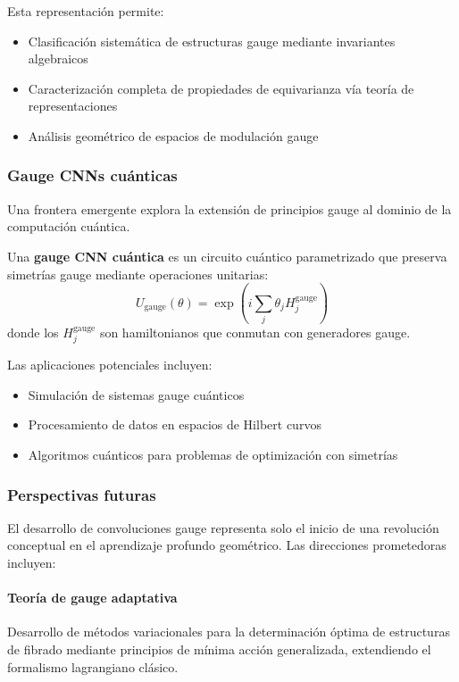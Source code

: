 Esta representación permite:
\begin{itemize}
\item Clasificación sistemática de estructuras gauge mediante invariantes algebraicos
\item Caracterización completa de propiedades de equivarianza vía teoría de representaciones
\item Análisis geométrico de espacios de modulación gauge
\end{itemize}

\subsubsection{Gauge CNNs cuánticas}

Una frontera emergente explora la extensión de principios gauge al dominio de la computación cuántica.

\begin{definition}
Una \textbf{gauge CNN cuántica} es un circuito cuántico parametrizado que preserva simetrías gauge mediante operaciones unitarias:
\begin{equation}
U_{\text{gauge}}(\theta) = \exp\left(i \sum_j \theta_j H_j^{\text{gauge}}\right)
\end{equation}
donde los $H_j^{\text{gauge}}$ son hamiltonianos que conmutan con generadores gauge.
\end{definition}

Las aplicaciones potenciales incluyen:
\begin{itemize}
\item Simulación de sistemas gauge cuánticos
\item Procesamiento de datos en espacios de Hilbert curvos
\item Algoritmos cuánticos para problemas de optimización con simetrías
\end{itemize}

\subsubsection{Perspectivas futuras}

El desarrollo de convoluciones gauge representa solo el inicio de una revolución conceptual en el aprendizaje profundo geométrico. Las direcciones prometedoras incluyen:

\paragraph{Teoría de gauge adaptativa}
Desarrollo de métodos variacionales para la determinación óptima de estructuras de fibrado mediante principios de mínima acción generalizada, extendiendo el formalismo lagrangiano clásico.

